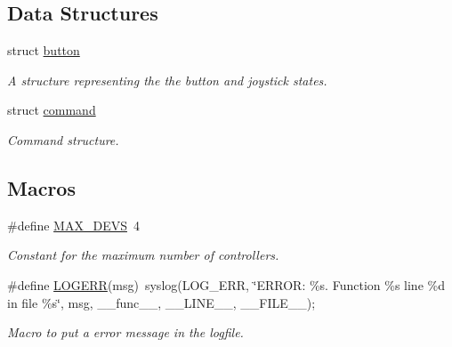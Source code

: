 \subsection*{Data Structures}
\begin{DoxyCompactItemize}
\item 
struct \hyperlink{structbutton}{button}
\begin{DoxyCompactList}\small\item\em A structure representing the the button and joystick states. \end{DoxyCompactList}\item 
struct \hyperlink{structcommand}{command}
\begin{DoxyCompactList}\small\item\em Command structure. \end{DoxyCompactList}\end{DoxyCompactItemize}
\subsection*{Macros}
\begin{DoxyCompactItemize}
\item 
\hypertarget{group__common_ga00cb63c6de93dec9cb1ea7136e5d8f0a}{\#define \hyperlink{group__common_ga00cb63c6de93dec9cb1ea7136e5d8f0a}{M\-A\-X\-\_\-\-D\-E\-V\-S}~4}\label{group__common_ga00cb63c6de93dec9cb1ea7136e5d8f0a}

\begin{DoxyCompactList}\small\item\em Constant for the maximum number of controllers. \end{DoxyCompactList}\item 
\hypertarget{group__common_ga068dec34b0de6d2862c26702e018a1d4}{\#define \hyperlink{group__common_ga068dec34b0de6d2862c26702e018a1d4}{L\-O\-G\-E\-R\-R}(msg)~syslog(L\-O\-G\-\_\-\-E\-R\-R, \char`\"{}E\-R\-R\-O\-R\-: \%s. Function \%s line \%d in file \%s\char`\"{}, msg, \-\_\-\-\_\-func\-\_\-\-\_\-, \-\_\-\-\_\-\-L\-I\-N\-E\-\_\-\-\_\-, \-\_\-\-\_\-\-F\-I\-L\-E\-\_\-\-\_\-);}\label{group__common_ga068dec34b0de6d2862c26702e018a1d4}

\begin{DoxyCompactList}\small\item\em Macro to put a error message in the logfile. \end{DoxyCompactList}\end{DoxyCompactItemize}

